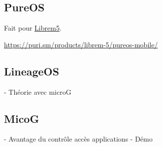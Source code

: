 \documentclass[compress]{beamer}
\begin{document}
\subsection{PureOS}
\begin{frame}
Fait pour \href{https://puri.sm/products/librem-5/}{Librem5}.\newline

\url{https://puri.sm/products/librem-5/pureos-mobile/}
\end{frame}

\subsection{LineageOS}
\begin{frame}
- Théorie avec microG
\end{frame}
\subsection{MicoG}
\begin{frame}
- Avantage du contrôle accès applications
- Démo
\end{frame}
\end{document}
